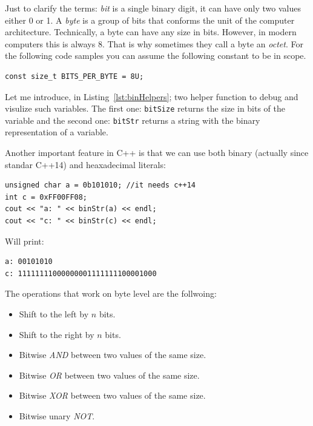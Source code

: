 Just to clarify the terms: \emph{bit} is a single binary digit, it can have only two values either 0 or 1. A \emph{byte} is a group of bits that conforms the unit of the computer architecture. Technically, a byte can have any size in bits. However, in modern computers this is always 8. That is why sometimes they call a byte an \emph{octet}. For the following code samples you can assume the following constant to be in scope.

\begin{verbatim}
const size_t BITS_PER_BYTE = 8U;
\end{verbatim}

Let me introduce, in Listing~\ref{lst:binHelpers}; two helper function to debug and visulize such variables. The first one: \texttt{bitSize} returns the size in bits of the variable and the second one: \texttt{bitStr} returns a string with the binary representation of a variable.

{\centering
\begin{minipage}{\linewidth}
\end{minipage}
\par
}

Another important feature in C++ is that we can use both binary (actually since standar C++14) and heaxadecimal literals:
\begin{verbatim}
unsigned char a = 0b101010; //it needs c++14
int c = 0xFF00FF08;
cout << "a: " << binStr(a) << endl;
cout << "c: " << binStr(c) << endl;
\end{verbatim}
Will print:
\begin{verbatim}
a: 00101010
c: 11111111000000001111111100001000
\end{verbatim} 


The operations that work on byte level are the follwoing:
\begin{itemize}
\item Shift to the left by $n$ bits.
\item Shift to the right by $n$ bits.
\item Bitwise \emph{AND} between two values of the same size.
\item Bitwise \emph{OR} between two values of the same size.
\item Bitwise \emph{XOR} between two values of the same size.
\item Bitwise unary \emph{NOT}.
\end{itemize}

